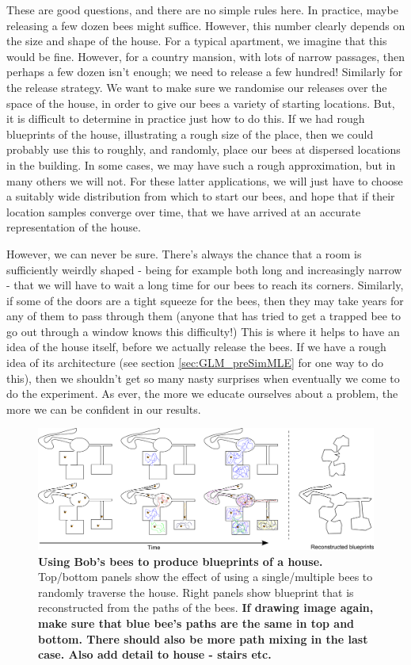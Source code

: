 \documentclass[11pt,fullpage]{book}
\begin{document}
These are good questions, and there are no simple rules here. In practice, maybe releasing a few dozen bees might suffice. However, this number clearly depends on the size and shape of the house. For a typical apartment, we imagine that this would be fine. However, for a country mansion, with lots of narrow passages, then perhaps a few dozen isn't enough; we need to release a few hundred! Similarly for the release strategy. We want to make sure we randomise our releases over the space of the house, in order to give our bees a variety of starting locations. But, it is difficult to determine in practice just how to do this. If we had rough blueprints of the house, illustrating a rough size of the place, then we could probably use this to roughly, and randomly, place our bees at dispersed locations in the building. In some cases, we may have such a rough approximation, but in many others we will not. For these latter applications, we will just have to choose a suitably wide distribution from which to start our bees, and hope that if their location samples converge over time, that we have arrived at an accurate representation of the house.

However, we can never be sure. There's always the chance that a room is sufficiently weirdly shaped - being for example both long and increasingly narrow - that we will have to wait a long time for our bees to reach its corners. Similarly, if some of the doors are a tight squeeze for the bees, then they may take years for any of them to pass through them (anyone that has tried to get a trapped bee to go out through a window knows this difficulty!) This is where it helps to have an idea of the house itself, before we actually release the bees. If we have a rough idea of its architecture (see section \ref{sec:GLM_preSimMLE} for one way to do this), then we shouldn't get so many nasty surprises when eventually we come to do the experiment. As ever, the more we educate ourselves about a problem, the more we can be confident in our results.

\begin{figure}
\centerline{\includegraphics[width=1\textwidth]{metropolisHastings_bobBees.pdf}}
\caption{\textbf{Using Bob's bees to produce blueprints of a house.} Top/bottom panels show the effect of using a single/multiple bees to randomly traverse the house. Right panels show blueprint that is reconstructed from the paths of the bees. \textbf{If drawing image again, make sure that blue bee's paths are the same in top and bottom. There should also be more path mixing in the last case. Also add detail to house - stairs etc.}}\label{fig:metropolisHastings_bobBees}
\end{figure}
\end{document}
